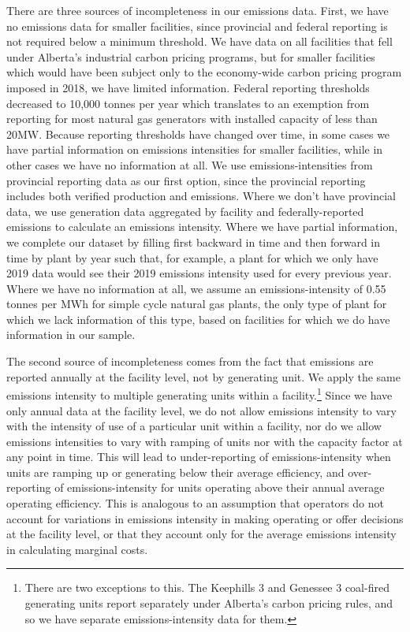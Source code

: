 \documentclass[12pt]{article}
\begin{document}
There are three sources of incompleteness in our emissions data. First, we have no emissions data for smaller facilities, since provincial and federal reporting is not required below a minimum threshold. We have data on all facilities that fell under Alberta's industrial carbon pricing programs, but for smaller facilities which would have been subject only to the economy-wide carbon pricing program imposed in 2018, we have limited information. Federal reporting thresholds decreased to 10,000 tonnes per year which translates to an exemption from reporting for most natural gas generators with installed capacity of less than 20MW. Because reporting thresholds have changed over time, in some cases we have partial information on emissions intensities for smaller facilities, while in other cases we have no information at all. We use emissions-intensities from provincial reporting data as our first option, since the provincial reporting includes both verified production and emissions. Where we don't have provincial data, we use generation data aggregated by facility and federally-reported emissions to calculate an emissions intensity. Where we have partial information, we complete our dataset by filling first backward in time and then forward in time by plant by year such that, for example, a plant for which we only have 2019 data would see their 2019 emissions intensity used for every previous year. Where we have no information at all, we assume an emissions-intensity of 0.55 tonnes per MWh for simple cycle natural gas plants, the only type of plant for which we lack information of this type, based on facilities for which we do have information in our sample.

The second source of incompleteness comes from the fact that emissions are reported annually at the facility level, not by generating unit. We apply the same emissions intensity to multiple generating units within a facility.\footnote{There are two exceptions to this. The Keephills 3 and Genessee 3 coal-fired generating units report separately under Alberta's carbon pricing rules, and so we have separate emissions-intensity data for them.} Since we have only annual data at the facility level, we do not allow emissions intensity to vary with the intensity of use of a particular unit within a facility, nor do we allow emissions intensities to vary with ramping of units nor with the capacity factor at any point in time. This will lead to under-reporting of emissions-intensity when units are ramping up or generating below their average efficiency, and over-reporting of emissions-intensity for units operating above their annual average operating efficiency. This is analogous to an assumption that operators do not account for variations in emissions intensity in making operating or offer decisions at the facility level, or that they account only for the average emissions intensity in calculating marginal costs.
\end{document}
